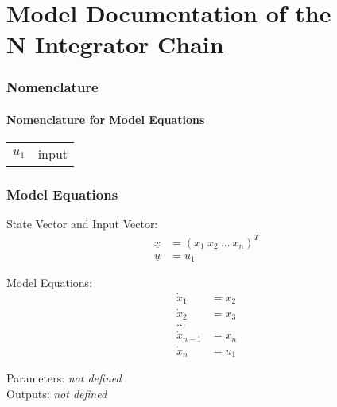 \documentclass[10pt,a4paper]{article}
\begin{document}
	\part*{Model Documentation of the \\ N Integrator Chain} %
	
	
	
	
	\section{Nomenclature} %
	\subsection{Nomenclature for Model Equations} %
	
	\begin{tabular}{ll}
		$u_1$ & input		
	\end{tabular}	
	
	
	\section{Model Equations} %
	State Vector and Input Vector:	
	\begin{align*}
		\underline{x} &= (x_1 \ x_2 \ \dots \ x_n)^T \\
		\underline{u} &= u_1
	\end{align*}

	\noindent Model Equations:
	\begin{subequations}
	\begin{align}
		\dot{x}_1 &= x_2 	\\      %
		\dot{x}_2 &= x_3	\\
		... &				\\
		\dot{x}_{n-1} &= x_n \\
		\dot{x}_n &= u_1 
	\end{align}
	\end{subequations}

	\noindent
	Parameters:   \textit{\textlangle not defined\textrangle}
	\\
	Outputs: \textit{\textlangle not defined\textrangle}
	
\end{document}
